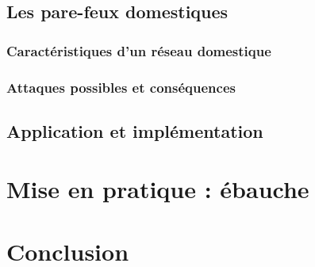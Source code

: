 \documentclass[]{article}
\begin{document}
\subsection{Les pare-feux domestiques}

\subsubsection{Caractéristiques d'un réseau domestique}

\subsubsection{Attaques possibles et conséquences}

\subsection{Application et implémentation}

\newpage

\section{Mise en pratique : ébauche}
\newpage
\section*{Conclusion}




\end{document}
